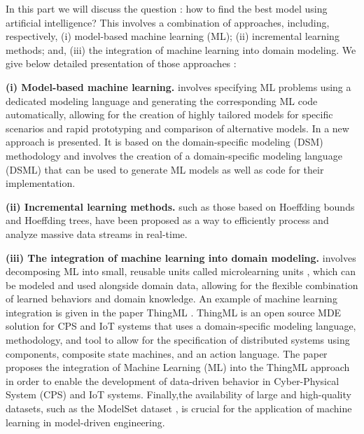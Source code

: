 In this part we will discuss the question : how to find the best model using artificial intelligence? This involves a combination of approaches, including, respectively, (i) model-based machine learning (ML); (ii) incremental learning methods; and, (iii) the integration of machine learning into domain modeling. We give below detailed presentation of those approaches : 

\smallskip
\noindent  \textbf{(i) Model-based machine learning.}  involves specifying ML problems using a dedicated modeling language and generating the corresponding ML code automatically, allowing for the creation of highly tailored models for specific scenarios and rapid prototyping and comparison of alternative models\cite{evolutionMDE}. In \cite{mdApproach} a new approach is presented. It is based on the domain-specific modeling (DSM) methodology and involves the creation of a domain-specific modeling language (DSML) that can be used to generate ML models as well as code for their implementation.

\smallskip
\noindent  \textbf{(ii) Incremental learning methods.} such as those based on Hoeffding bounds and Hoeffding trees, have been proposed as a way to efficiently process and analyze massive data streams in real-time\cite{evolutionMDE}. 


\smallskip
\noindent  \textbf{(iii) The integration of machine learning into domain modeling.}  involves decomposing ML into small, reusable units called microlearning units \cite{evolutionMDE}, which can be modeled and used alongside domain data, allowing for the flexible combination of learned behaviors and domain knowledge. An example of machine learning integration is given in the paper ThingML \cite{ThingML}.  ThingML is an open source MDE solution for CPS and IoT systems that uses a domain-specific modeling language, methodology, and tool to allow for the specification of distributed systems using components, composite state machines, and an action language. The paper proposes the integration of Machine Learning (ML) into the ThingML approach in order to enable the development of data-driven behavior in Cyber-Physical System (CPS) and IoT systems. Finally,the availability of large and high-quality datasets, such as the ModelSet dataset \cite{modelset}, is crucial for the application of machine learning in model-driven engineering.


